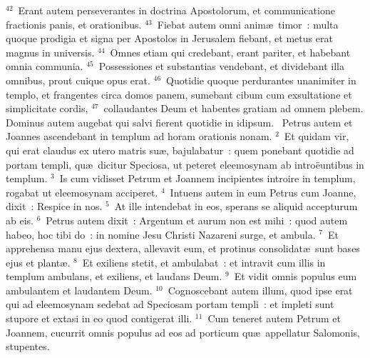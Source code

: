 ${}^{42}$~Erant autem perseverantes in doctrina Apostolorum, et communicatione fractionis panis, et orationibus.
${}^{43}$~Fiebat autem omni anim\ae\ timor~: multa quoque prodigia et signa per Apostolos in Jerusalem fiebant, et metus erat magnus in universis.
${}^{44}$~Omnes etiam qui credebant, erant pariter, et habebant omnia communia.
${}^{45}$~Possessiones et substantias vendebant, et dividebant illa omnibus, prout cuique opus erat.
${}^{46}$~Quotidie quoque perdurantes unanimiter in templo, et frangentes circa domos panem, sumebant cibum cum exsultatione et simplicitate cordis,
${}^{47}$~collaudantes Deum et habentes gratiam ad omnem plebem. Dominus autem augebat qui salvi fierent quotidie in idipsum.
~\lettrine[lines=10,image=true,loversize=0.05,lraise=-0.03]{P}{}etrus autem et Joannes ascendebant in templum ad horam orationis nonam.
${}^{2}$~Et quidam vir, qui erat claudus ex utero matris su\ae , bajulabatur~: quem ponebant quotidie ad portam templi, qu\ae\ dicitur Speciosa, ut peteret eleemosynam ab intro\"euntibus in templum.
${}^{3}$~Is cum vidisset Petrum et Joannem incipientes introire in templum, rogabat ut eleemosynam acciperet.
${}^{4}$~Intuens autem in eum Petrus cum Joanne, dixit~: Respice in nos.
${}^{5}$~At ille intendebat in eos, sperans se aliquid accepturum ab eis.
${}^{6}$~Petrus autem dixit~: Argentum et aurum non est mihi~: quod autem habeo, hoc tibi do~: in nomine Jesu Christi Nazareni surge, et ambula.
${}^{7}$~Et apprehensa manu ejus dextera, allevavit eum, et protinus consolidat\ae\ sunt bases ejus et plant\ae .
${}^{8}$~Et exiliens stetit, et ambulabat~: et intravit cum illis in templum ambulans, et exiliens, et laudans Deum.
${}^{9}$~Et vidit omnis populus eum ambulantem et laudantem Deum.
${}^{10}$~Cognoscebant autem illum, quod ipse erat qui ad eleemosynam sedebat ad Speciosam portam templi~: et impleti sunt stupore et extasi in eo quod contigerat illi.
${}^{11}$~Cum teneret autem Petrum et Joannem, cucurrit omnis populus ad eos ad porticum qu\ae\ appellatur Salomonis, stupentes.


